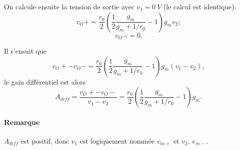 \documentclass[frenchb,DIV=14]{scrartcl}
\begin{document}
On calcule ensuite la tension de sortie avec $v_1 = \SI{0}{V}$ (le calcul est identique):
\[v_O+ = \frac{r_0}{2}\left(\frac{1}{2}\frac{g_m}{g_m+1/r_0} - 1\right)g_m v_2;\]
\[v_O- = 0.\]

Il s'ensuit que
\[v_O+ - v_O- = \frac{r_0}{2}\left(\frac{1}{2}\frac{g_m}{g_m+1/r_0}-1\right)g_m(v_1-v_2),\]
le gain différentiel est alors
\[A_{diff} =
\frac{v_O+ - v_O-}{v_1-v_2} = \frac{r_0}{2}\left(\frac{1}{2}\frac{g_m}{g_m+1/r_0}-1\right)g_m.\]

\paragraph{Remarque} $A_{diff}$ est positif, donc $v_1$ est logiquement nommée $v_{in+}$ et
$v_2$, $v_{in-}$.
\end{document}
